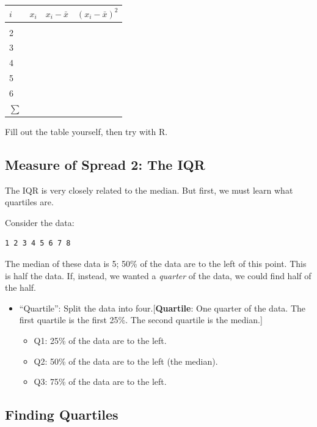 \documentclass[
  letterpaper,
  DIV=11,
  numbers=noendperiod,
  oneside]{scrreprt}
\providecommand{\tightlist}{%
  \setlength{\itemsep}{0pt}\setlength{\parskip}{0pt}}\usepackage{longtable,booktabs,array}
\begin{document}
\begin{longtable}[]{@{}llll@{}}
\toprule\noalign{}
\(i\) & \(x_i\) & \(x_i - \bar x\) & \((x_i - \bar x)^2\) \\
\midrule\noalign{}
\endhead
\bottomrule\noalign{}
\endlastfoot
1 & & & \\
2 & & & \\
3 & & & \\
4 & & & \\
5 & & & \\
6 & & & \\
\(\sum\) & & & \\
\end{longtable}

Fill out the table yourself, then try with R.

\hypertarget{measure-of-spread-2-the-iqr}{%
\subsection{Measure of Spread 2: The
IQR}\label{measure-of-spread-2-the-iqr}}

The IQR is very closely related to the median. But first, we must learn
what quartiles are.

Consider the data:

\begin{verbatim}
1 2 3 4 5 6 7 8
\end{verbatim}

The median of these data is 5; 50\% of the data are to the left of this
point. This is half the data. If, instead, we wanted a \emph{quarter} of
the data, we could find half of the half.

\begin{itemize}
\tightlist
\item
  ``Quartile'': Split the data into four.{[}\textbf{Quartile}: One
  quarter of the data. The first quartile is the first 25\%. The second
  quartile is the median.{]}

  \begin{itemize}
  \tightlist
  \item
    Q1: 25\% of the data are to the left.
  \item
    Q2: 50\% of the data are to the left (the median).
  \item
    Q3: 75\% of the data are to the left.
  \end{itemize}
\end{itemize}

\hypertarget{finding-quartiles}{%
\subsection{Finding Quartiles}\label{finding-quartiles}}
\end{document}
